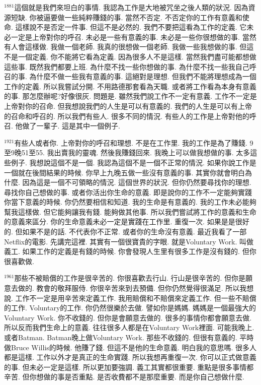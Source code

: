 \documentclass{book}
\begin{document}
$^{1881}$這個就是我們來坦白的事情.
我認為工作是大地被咒坐之後人類的狀況.
因為資源短缺.
你被逼要做一些純粹賺錢的事.
當然不否定.
不否定你的工作有意義和使命.
這樣說不是否定一件事.
但這不是必然的.
我們不要把這看為工作的定義.
它未必一定是上帝對你的呼召.
未必是一些有意義的事.
未必是一些你很想做的事.
當然有人會這樣做.
我做一個老師.
我真的很想做一個老師.
我做一些我想做的事.
但這不是一個定義.
你不能將它看為定義.
因為很多人不是這樣.
當然我們盡可能都想做這些事.
既然我們都要上班.
為什麼不找一些你想做的事.
為什麼不找一些我自己呼召的事.
為什麼不做一些我有意義的事.
這絕對是理想.
但我們不能將理想成為一個工作的定義.
所以我嘗試分開.
不用路德那套看為天職.
或者將工作看為本身有意義的事.
那怎麼辦呢?好像很灰.
問題是.
雖然我們說工作不一定有意義.
工作不一定是上帝對你的召命.
但我想說我們的人生是可以有意義的.
我們的人生是可以有上帝的召命和呼召的.
所以我們有些人.
很多不同的情況.
有些人的工作是上帝對他的呼召.
他做了一輩子.
這是其中一個例子.

$^{1921}$有些人或者你.
上帝對你的呼召和理想.
不是在工作里.
我的工作是為了賺錢.
9至9晚51至55.
我出賣我的靈魂.
然後我賺錢回來.
我晚上可以做我想做的事.
太多這些例子.
我想說這個不是一個.
我認為這個不是一個不正常的情況.
如果你說工作是一個就在後間結果的時候.
你早上九晚五做一些沒有意義的事.
其實你就會明白為什麼.
因為這是一個不可領略的情況.
這個世界的狀況.
但你仍然要尋找你的理想.
尋找你自己想做的事.
或者你活出你生命的意義.
即是說你的工作不一定能夠實踐你當下意義的時候.
你仍然要相信和知道.
我的生命是有意義的.
我的工作未必能夠幫我這樣做.
但它能夠讓我有錢.
能夠做其他事.
所以我們嘗試將工作的意義和生命的意義來區分.
你的生命意義未必一定是實踐在工作里.
重復一次.
如果是是很好的.
但如果不是的話.
不代表你不正常.
或者你的生命沒有意義.
最近我看了一部Netflix的電影.
先講完這裡.
其實有一個很寶貴的字眼.
就是Voluntary Work.
叫做義工.
如果工作的定義是有錢的時候.
你會發現人生里有很多工作是沒有錢的.
但你很喜歡做.

$^{1961}$那些不被賠償的工作是很辛苦的.
你很喜歡去行山.
行山是很辛苦的.
但你是願意去做的.
教會的敬拜服侍.
你很辛苦來到去預備.
但你仍然覺得很滿足.
所以我想說.
工作不一定是用辛苦來定義工作.
我用賠償和不賠償來定義工作.
但一些不賠償的工作.
Voluntary的工作.
你仍然很樂於去做.
譬如你是媽媽.
媽媽是一個最強大的Voluntary Work.
你不收錢的.
但你是會願意去做的.
很多的事情你都會願意去做.
所以反而我們生命上的意義.
往往很多人都是在Voluntary Work裡面.
可能我晚上.
或者Batman.
Batman晚上做Voluntary Work.
那些不收錢的.
但很有意義的.
平時做Bruce Willis的時候.
他賺了錢.
但這不是他的生命意義.
明白我的意思嗎.
很多人都是這樣.
工作以外才是真正的生命實踐.
所以我想再重復一次.
你可以正式做意義的事.
但未必一定是這樣.
所以更加要強調.
義工其實都很重要.
重點是很多事情都辛苦.
但你想做的事是否重點.
是否收費都不是那麼重要.
而是你自己想做什麼.
\end{document}
